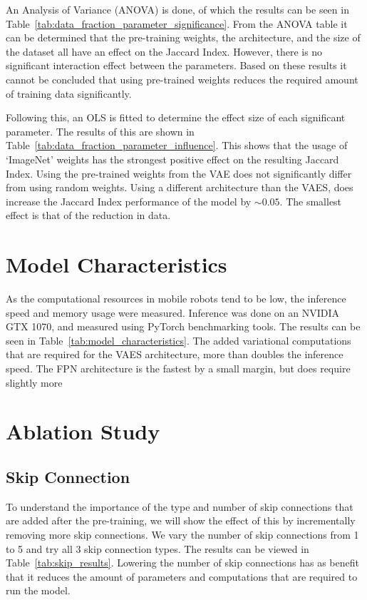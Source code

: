 An Analysis of Variance (ANOVA) is done, of which the results can be seen in Table~\ref{tab:data_fraction_parameter_significance}. From the ANOVA table it can be determined that the pre-training weights, the architecture, and the size of the dataset all have an effect on the Jaccard Index. However, there is no significant interaction effect between the parameters. Based on these results it cannot be concluded that using pre-trained weights reduces the required amount of training data significantly. 

Following this, an OLS is fitted to determine the effect size of each significant parameter. The results of this are shown in Table~\ref{tab:data_fraction_parameter_influence}. This shows that the usage of `ImageNet' weights has the strongest positive effect on the resulting Jaccard Index. Using the pre-trained weights from the VAE does not significantly differ from using random weights. Using a different architecture than the VAES, does increase the Jaccard Index performance of the model by $\sim0.05$. The smallest effect is that of the reduction in data.



\section{Model Characteristics}

As the computational resources in mobile robots tend to be low, the inference speed and memory usage were measured. Inference was done on an NVIDIA GTX 1070, and measured using PyTorch benchmarking tools. The results can be seen in Table~\ref{tab:model_characteristics}. The added variational computations that are required for the VAES architecture, more than doubles the inference speed. The FPN architecture is the fastest by a small margin, but does require slightly more 




\section{Ablation Study}

\subsection{Skip Connection}
To understand the importance of the type and number of skip connections that are added after the pre-training, we will show the effect of this by incrementally removing more skip connections. We vary the number of skip connections from 1 to 5 and try all 3 skip connection types. The results can be viewed in Table~\ref{tab:skip_results}. Lowering the number of skip connections has as benefit that it reduces the amount of parameters and computations that are required to run the model.


